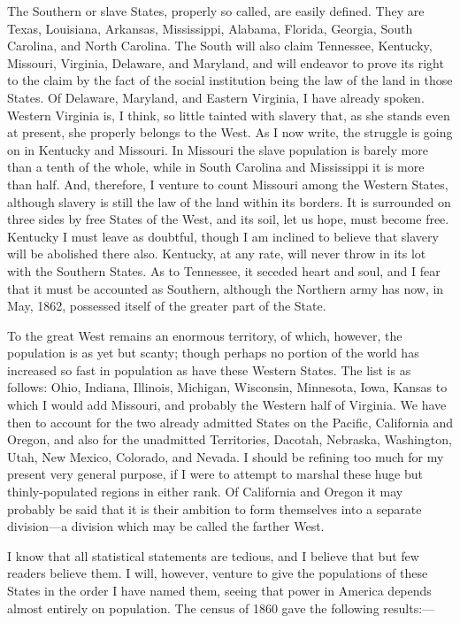 The Southern or slave States, properly so called, are easily
defined.  They are Texas, Louisiana, Arkansas, Mississippi,
Alabama, Florida, Georgia, South Carolina, and North Carolina.  The
South will also claim Tennessee, Kentucky, Missouri, Virginia,
Delaware, and Maryland, and will endeavor to prove its right to the
claim by the fact of the social institution being the law of the
land in those States.  Of Delaware, Maryland, and Eastern Virginia,
I have already spoken.  Western Virginia is, I think, so little
tainted with slavery that, as she stands even at present, she
properly belongs to the West.  As I now write, the struggle is
going on in Kentucky and Missouri.  In Missouri the slave
population is barely more than a tenth of the whole, while in South
Carolina and Mississippi it is more than half.  And, therefore, I
venture to count Missouri among the Western States, although
slavery is still the law of the land within its borders.  It is
surrounded on three sides by free States of the West, and its soil,
let us hope, must become free.  Kentucky I must leave as doubtful,
though I am inclined to believe that slavery will be abolished
there also.  Kentucky, at any rate, will never throw in its lot
with the Southern States.  As to Tennessee, it seceded heart and
soul, and I fear that it must be accounted as Southern, although
the Northern army has now, in May, 1862, possessed itself of the
greater part of the State.

To the great West remains an enormous territory, of which, however,
the population is as yet but scanty; though perhaps no portion of
the world has increased so fast in population as have these Western
States.  The list is as follows: Ohio, Indiana, Illinois, Michigan,
Wisconsin, Minnesota, Iowa, Kansas to which I would add Missouri,
and probably the Western half of Virginia.  We have then to account
for the two already admitted States on the Pacific, California and
Oregon, and also for the unadmitted Territories, Dacotah, Nebraska,
Washington, Utah, New Mexico, Colorado, and Nevada.  I should be
refining too much for my present very general purpose, if I were to
attempt to marshal these huge but thinly-populated regions in
either rank.  Of California and Oregon it may probably be said that
it is their ambition to form themselves into a separate division---a
division which may be called the farther West.

I know that all statistical statements are tedious, and I believe
that but few readers believe them.  I will, however, venture to
give the populations of these States in the order I have named
them, seeing that power in America depends almost entirely on
population.  The census of 1860 gave the following results:---%


